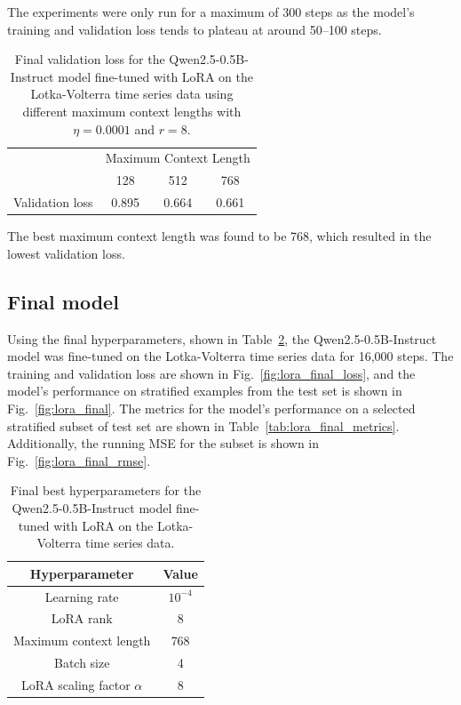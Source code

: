 \documentclass[11pt,a4paper]{article}
\begin{document}
The experiments were only run for a maximum of 300 steps as the model's training and validation loss tends to plateau at around 50--100 steps.

\begin{table}[h]
    \centering
    \begin{tabular}{c|c|c|c}
        & \multicolumn{3}{|c}{Maximum Context Length} \\
        & 128 & 512 & 768 \\
        \hline
        Validation loss & 0.895 & 0.664 & 0.661 \\
    \end{tabular}
    \caption{Final validation loss for the Qwen2.5-0.5B-Instruct model fine-tuned with LoRA on the Lotka-Volterra time series data using different maximum context lengths with $\eta=0.0001$ and $r=8$.}
    \label{tab:lora_max_context}
\end{table}

The best maximum context length was found to be 768, which resulted in the lowest validation loss.
\clearpage
\subsection{Final model}
\label{sec:final_model}
Using the final hyperparameters, shown in Table~\ref{tab:lora_final_hyperparameters}, the Qwen2.5-0.5B-Instruct model was fine-tuned on the Lotka-Volterra time series data for 16,000 steps. The training and validation loss are shown in Fig.~\ref{fig:lora_final_loss}, and the model's performance on stratified examples from the test set is shown in Fig.~\ref{fig:lora_final}. The metrics for the model's performance on a selected stratified subset of test set are shown in Table~\ref{tab:lora_final_metrics}. Additionally, the running MSE for the subset is shown in Fig.~\ref{fig:lora_final_rmse}.

\begin{table}[h]
    \centering
    \begin{tabular}{c|c}
        Hyperparameter & Value \\
        \hline
        Learning rate & $10^{-4}$ \\
        LoRA rank & 8 \\
        Maximum context length & 768 \\
        Batch size & 4 \\
        LoRA scaling factor $\alpha$ & 8 \\
    \end{tabular}
    \caption{Final best hyperparameters for the Qwen2.5-0.5B-Instruct model fine-tuned with LoRA on the Lotka-Volterra time series data.}
    \label{tab:lora_final_hyperparameters}
\end{table}
\end{document}
